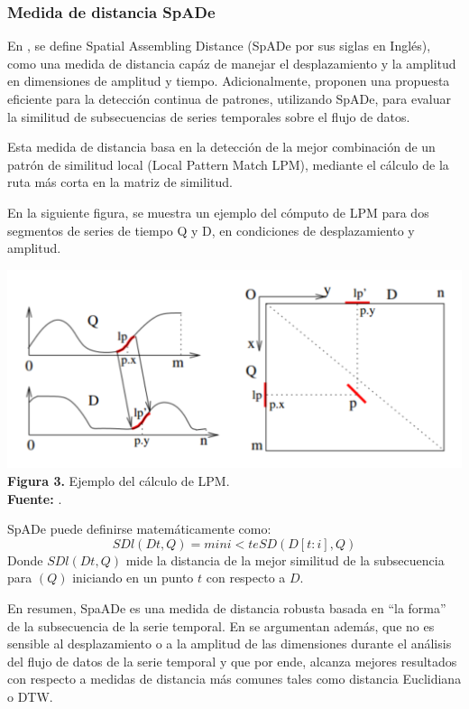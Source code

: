 \subsubsection{\textbf{Medida de distancia SpADe}}
En \cite{spade}, se define Spatial Assembling Distance
(SpADe por sus siglas en Ingl\'es), como una medida de distancia cap\'az de manejar el desplazamiento y la amplitud en dimensiones de amplitud y tiempo. Adicionalmente, proponen una propuesta eficiente para la detecci\'on continua de patrones, utilizando SpADe, para evaluar la similitud de subsecuencias de series temporales sobre el flujo de datos.\par
Esta medida de distancia basa en la detecci\'on de la mejor combinaci\'on de un patr\'on de similitud local (Local Pattern Match LPM), mediante el c\'alculo de la ruta m\'as corta en la matriz de similitud.\par 
En la siguiente figura, se muestra un ejemplo del c\'omputo de LPM para dos segmentos de series de tiempo Q y D, en condiciones de desplazamiento y amplitud.
\begin{center}
\includegraphics[scale=0.9]{spade.png}\\
\vspace*{10pt}
\footnotesize{\textbf{Figura 3.} Ejemplo del c\'alculo de LPM.}\\ \textbf{Fuente:} \cite{swale}.
\end{center}
SpADe puede definirse matem\'aticamente como:
\begin{equation}
SDl(Dt, Q) = mini<te SD(D[t : i], Q)
\end{equation}
Donde $SDl(Dt, Q)$ mide la distancia de la mejor similitud de la subsecuencia para $(Q)$ iniciando en un punto $t$ con respecto a $D$.\par
En resumen, SpaADe es una medida de distancia robusta basada en \enquote{la forma} de la subsecuencia de la serie temporal. En \cite{spade} se argumentan adem\'as, que no es sensible al desplazamiento o a la amplitud de las dimensiones durante el an\'alisis del flujo de datos de la serie temporal y que por ende, alcanza mejores resultados con respecto a medidas de distancia m\'as comunes tales como distancia Euclidiana o DTW.
